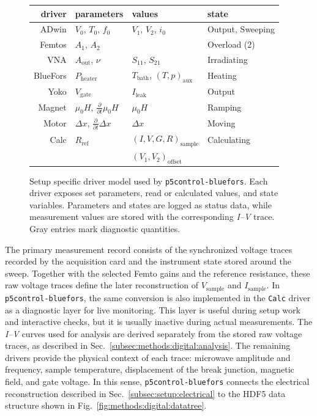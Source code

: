             \begin{figure}[t]
                \centering
                \small
                    \begin{tabular}{r|l|l|l}
                        driver & parameters & values & state \\\hline
                        ADwin & $V_0$, $T_0$, $f_0$ & $V_1$, $V_2$, $i_0$ & Output, Sweeping \\
                        Femtos & $A_1$, $A_2$ &  & {\color{seegrau100}Overload (2)} \\
                        VNA & $A_\mathrm{out}$, $\nu$ & {\color{seegrau100} $S_{11}$, $S_{21}$} & Irradiating\\
                        BlueFors & $P_\mathrm{heater}$ & $T_\mathrm{bath}$, {\color{seegrau100}$(T, p)_\mathrm{aux}$} & Heating\\
                        Yoko & $V_\mathrm{gate}$ & {\color{seegrau100}$I_\mathrm{leak}$} & Output\\
                        Magnet & $\mu_0H$, $\tfrac{\partial}{\partial t}\mu_0H$ & $\mu_0H$ & Ramping\\
                        Motor & $\Delta x$, $\tfrac{\partial}{\partial t}\Delta x$ & $\Delta x$ & Moving\\
                        Calc & $R_\mathrm{ref}$ & {\color{seegrau100}$(I, V, G, R)_\mathrm{sample}$} & Calculating\\
                            & &  {\color{seegrau100}$(V_1, V_2)_{\mathrm{offset}}$}\\
                    \end{tabular}
                \caption{Setup specific driver model used by \texttt{p5control-bluefors}. Each driver exposes set parameters, read or calculated values, and state variables. Parameters and states are logged as status data, while measurement values are stored with the corresponding \textit{I--V} trace. Gray entries mark diagnostic quantities.}
                \label{fig:methods:digital:drivers}
            \end{figure}

            The primary measurement record consists of the synchronized voltage traces recorded by the acquisition card and the instrument state stored around the sweep. Together with the selected Femto gains and the reference resistance, these raw voltage traces define the later reconstruction of $V_\mathrm{sample}$ and $I_\mathrm{sample}$. In \texttt{p5control-bluefors}, the same conversion is also implemented in the \texttt{Calc} driver as a diagnostic layer for live monitoring. This layer is useful during setup work and interactive checks, but it is usually inactive during actual measurements. The \textit{I--V} curves used for analysis are derived separately from the stored raw voltage traces, as described in Sec.~\ref{subsec:methods:digital:analysis}. The remaining drivers provide the physical context of each trace: microwave amplitude and frequency, sample temperature, displacement of the break junction, magnetic field, and gate voltage. In this sense, \texttt{p5control-bluefors} connects the electrical reconstruction described in Sec.~\ref{subsec:setup:electrical} to the HDF5 data structure shown in Fig.~\ref{fig:methods:digital:datatree}.

